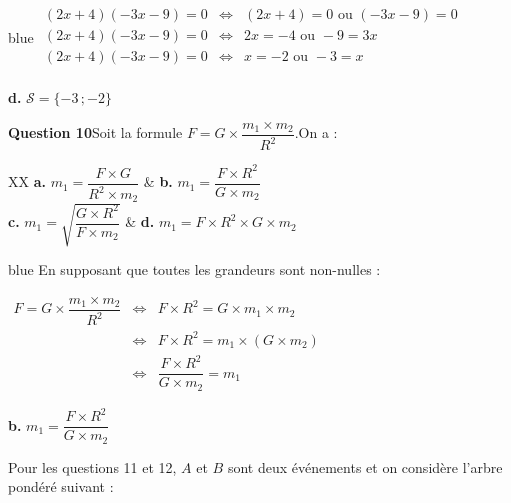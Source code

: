 	\begin{color}{blue}
	\(
	\begin{array}{ccc}
	(2x+4)(-3x-9)=0 &\iff& (2x+4)=0\text{ ou }(-3x-9)=0 \\
	(2x+4)(-3x-9)=0 &\iff& 2x=-4\text{ ou }-9=3x \\
	(2x+4)(-3x-9)=0 &\iff& x=-2\text{ ou }-3=x \\
	\end{array}
	\)
	
	\textbf{d.} $\mathcal{S}=\{-3\,;-2\}$
	
	\end{color}
	
	\medskip
	
	\textbf{Question 10}\quad Soit la formule \quad $F=G\times\dfrac{m_{1}\times m_{2}}{R^{2}}$.\quad On a :
	

	\begin{tblr}{XX}
		\textbf{a.} $m_{1}=\dfrac{F\times G}{R^{2}\times m_{2}}$ & \textbf{b.} $m_{1}=\dfrac{F\times R^{2}}{G\times m_{2}}$\\ 
		\textbf{c.} $m_{1}=\sqrt{\dfrac{G\times R^{2}}{F\times m_{2}}}$ & \textbf{d.} $m_{1}=F\times R^{2}\times G\times m_{2}$ \\
	\end{tblr}


	\begin{color}{blue}
En supposant que toutes les grandeurs sont non-nulles :	
	
	\(
	\begin{array}{ccc}
	F=G\times\dfrac{m_{1}\times m_{2}}{R^{2}} &\iff& F \times R^{2} = G\times m_{1}\times m_{2}\\
	&\iff& F \times R^{2} =  m_{1}\times(G \times m_{2})\\
	&\iff& \dfrac{F \times R^{2}}{G\times m_{2}} = m_{1}
	\end{array}
	\)
	
	\textbf{b.} $m_{1}=\dfrac{F\times R^{2}}{G\times m_{2}}$
	
	\end{color}



	\medskip
	
	Pour les questions 11 et 12, $A$ et $B$ sont deux événements et on considère l'arbre pondéré suivant :
	
